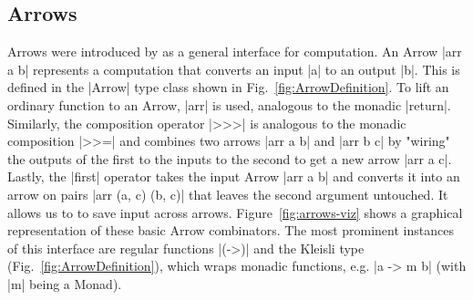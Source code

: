 \subsection{Arrows}
\label{sec:arrows}
Arrows were introduced by \citet{HughesArrows} as a general interface for computation. An Arrow |arr a b| represents  a computation that converts an input |a| to an output |b|. This is defined in the |Arrow| type class shown in Fig.~\ref{fig:ArrowDefinition}.
%
To lift an ordinary function to an Arrow, |arr| is used, analogous to the monadic |return|. Similarly, the composition operator |>>>| is analogous to the monadic composition |>>=| and combines two arrows |arr a b| and |arr b c| by "wiring" the outputs of the first to the inputs to the second to get a new arrow |arr a c|. Lastly, the |first| operator takes the input Arrow |arr a b| and converts it into an arrow on pairs |arr (a, c) (b, c)| that leaves the second argument untouched. It allows us to to save input across arrows. Figure~\ref{fig:arrows-viz} shows a graphical representation of these basic Arrow combinators.
The most prominent instances of this interface are regular functions |(->)|
and the Kleisli type (Fig.~\ref{fig:ArrowDefinition}), which wraps monadic functions, e.g.  |a -> m b| (with |m| being a Monad).

